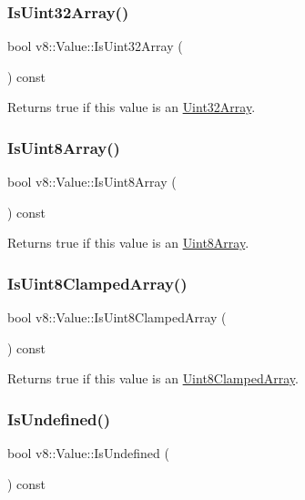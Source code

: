 \subsubsection{\texorpdfstring{Is\+Uint32\+Array()}{IsUint32Array()}}
{\footnotesize\ttfamily bool v8\+::\+Value\+::\+Is\+Uint32\+Array (\begin{DoxyParamCaption}{ }\end{DoxyParamCaption}) const}

Returns true if this value is an \mbox{\hyperlink{classv8_1_1Uint32Array}{Uint32\+Array}}. \mbox{\label{classv8_1_1Value_af11d828f1a78df0de696e210571b7860}} 
\subsubsection{\texorpdfstring{Is\+Uint8\+Array()}{IsUint8Array()}}
{\footnotesize\ttfamily bool v8\+::\+Value\+::\+Is\+Uint8\+Array (\begin{DoxyParamCaption}{ }\end{DoxyParamCaption}) const}

Returns true if this value is an \mbox{\hyperlink{classv8_1_1Uint8Array}{Uint8\+Array}}. \mbox{\label{classv8_1_1Value_a655a46fa71c8a33d138756d8a6c515ac}} 
\subsubsection{\texorpdfstring{Is\+Uint8\+Clamped\+Array()}{IsUint8ClampedArray()}}
{\footnotesize\ttfamily bool v8\+::\+Value\+::\+Is\+Uint8\+Clamped\+Array (\begin{DoxyParamCaption}{ }\end{DoxyParamCaption}) const}

Returns true if this value is an \mbox{\hyperlink{classv8_1_1Uint8ClampedArray}{Uint8\+Clamped\+Array}}. \mbox{\label{classv8_1_1Value_ad3a7686feef02fbe0317570b9640b078}} 
\subsubsection{\texorpdfstring{Is\+Undefined()}{IsUndefined()}}
{\footnotesize\ttfamily bool v8\+::\+Value\+::\+Is\+Undefined (\begin{DoxyParamCaption}{ }\end{DoxyParamCaption}) const}

